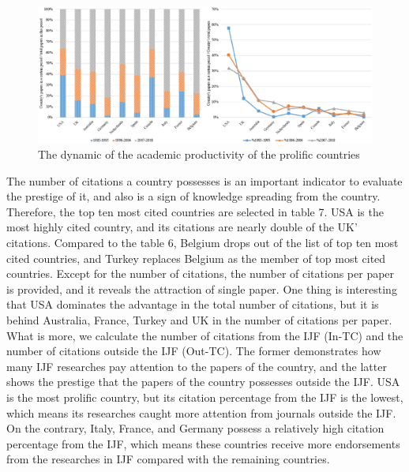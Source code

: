 \documentclass[11pt,a4paper]{elsarticle} %
\begin{document}
\begin{figure}[htbp]
\centering
\includegraphics[scale=0.4]{fig.6.eps}
\caption{The dynamic of the academic productivity of the prolific countries}
\end{figure}

The number of citations a country possesses is an important indicator to
evaluate the prestige of it, and also is a sign of knowledge spreading
from the country. Therefore, the top ten most cited countries are
selected in table 7. USA is the most highly cited country, and its
citations are nearly double of the UK' citations. Compared to the table
6, Belgium drops out of the list of top ten most cited countries, and
Turkey replaces Belgium as the member of top most cited countries.
Except for the number of citations, the number of citations per paper is
provided, and it reveals the attraction of single paper. One thing is
interesting that USA dominates the advantage in the total number of
citations, but it is behind Australia, France, Turkey and UK in the
number of citations per paper. What is more, we calculate the number of
citations from the IJF (In-TC) and the number of citations outside the
IJF (Out-TC). The former demonstrates how many IJF researches pay
attention to the papers of the country, and the latter shows the
prestige that the papers of the country possesses outside the IJF. USA
is the most prolific country, but its citation percentage from the IJF
is the lowest, which means its researches caught more attention from
journals outside the IJF. On the contrary, Italy, France, and Germany
possess a relatively high citation percentage from the IJF, which means
these countries receive more endorsements from the researches in IJF
compared with the remaining countries.
\end{document}
